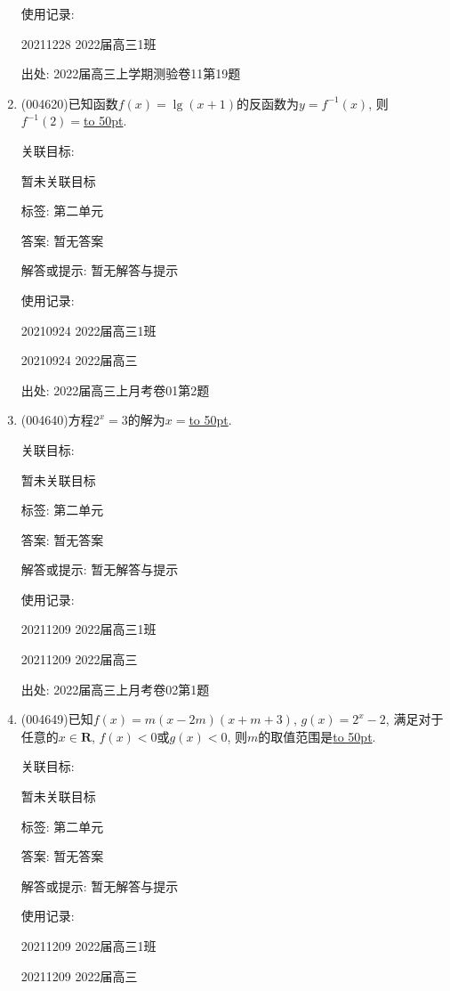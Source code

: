 \documentclass[10pt,a4paper]{article}
\newcommand{\blank}[1]{\underline{\hbox to #1pt{}}}
\begin{document}
\begin{enumerate}[1.]
使用记录:

20211228	2022届高三1班		


出处: 2022届高三上学期测验卷11第19题
\item { (004620)}已知函数$f(x)=\lg (x+1)$的反函数为$y=f^{-1}(x)$, 则$f^{-1}(2)=$\blank{50}.


关联目标:

暂未关联目标



标签: 第二单元

答案: 暂无答案

解答或提示: 暂无解答与提示

使用记录:

20210924	2022届高三1班	

20210924	2022届高三	


出处: 2022届高三上月考卷01第2题
\item { (004640)}方程$2^x=3$的解为$x=$\blank{50}.


关联目标:

暂未关联目标



标签: 第二单元

答案: 暂无答案

解答或提示: 暂无解答与提示

使用记录:

20211209	2022届高三1班	

20211209	2022届高三	


出处: 2022届高三上月考卷02第1题
\item { (004649)}已知$f(x)=m(x-2m)(x+m+3)$, $g(x)=2^x-2$, 满足对于任意的$x\in \mathbf{R}$, $f(x)<0$或$g(x)<0$, 则$m$的取值范围是\blank{50}.


关联目标:

暂未关联目标



标签: 第二单元

答案: 暂无答案

解答或提示: 暂无解答与提示

使用记录:

20211209	2022届高三1班	

20211209	2022届高三	



\end{enumerate}
\end{document}
